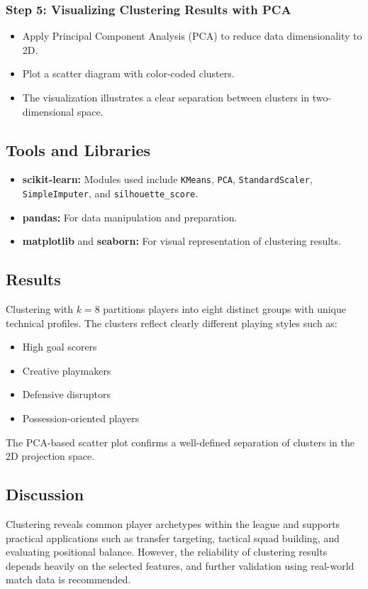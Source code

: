 \documentclass[12pt,a4paper]{article}
\begin{document}
\subsubsection{Step 5: Visualizing Clustering Results with PCA}
\begin{itemize}
    \item Apply Principal Component Analysis (PCA) to reduce data dimensionality to 2D.
    \item Plot a scatter diagram with color-coded clusters.
    \item The visualization illustrates a clear separation between clusters in two-dimensional space.
\end{itemize}

\subsection{Tools and Libraries}
\begin{itemize}
    \item \textbf{scikit-learn:} Modules used include \texttt{KMeans}, \texttt{PCA}, \texttt{StandardScaler}, \texttt{SimpleImputer}, and \texttt{silhouette\_score}.
    \item \textbf{pandas:} For data manipulation and preparation.
    \item \textbf{matplotlib} and \textbf{seaborn:} For visual representation of clustering results.
\end{itemize}

\subsection{Results}
Clustering with $k = 8$ partitions players into eight distinct groups with unique technical profiles. The clusters reflect clearly different playing styles such as:
\begin{itemize}
    \item High goal scorers
    \item Creative playmakers
    \item Defensive disruptors
    \item Possession-oriented players
\end{itemize}
The PCA-based scatter plot confirms a well-defined separation of clusters in the 2D projection space.

\subsection{Discussion}
Clustering reveals common player archetypes within the league and supports practical applications such as transfer targeting, tactical squad building, and evaluating positional balance. However, the reliability of clustering results depends heavily on the selected features, and further validation using real-world match data is recommended.
\end{document}

